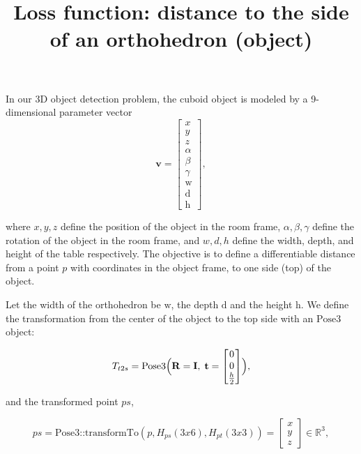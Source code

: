 \documentclass[11pt]{article}
\begin{document}
\title{Loss function: distance to the side of an orthohedron (object)}
\maketitle

    In our 3D object detection problem, the cuboid object is modeled by a 9-dimensional parameter vector
    \begin{equation}
        \mathbf{v} = \begin{bmatrix} x \\ y \\ z \\ \alpha \\ \beta \\ \gamma \\ \text{w} \\ \text{d} \\ \text{h} \end{bmatrix},\label{eq:equation_1}
    \end{equation}

    where $x,y,z$ define the position of the object in the room frame, $\alpha,\beta,\gamma$ define the rotation of the object in the room frame, and $w,d,h$ define the width, depth, and height of the table respectively.
    The objective is to define a differentiable distance from a point $p$ with coordinates in the object frame, to one side (top) of the object.

    Let the width of the orthohedron be \(\text{w}\), the depth \(\text{d}\) and the height \(\text{h}\).
    We define the transformation from the center of the object to the top side with an \(\text{Pose3}\) object:

    \begin{equation}
        T_{t2s} = \text{Pose3}\Bigl(\mathbf{R}=\mathbf{I},\; \mathbf{t} = \begin{bmatrix} 0 \\  0 \\ \frac{h}{2} \end{bmatrix}\Bigr),
    \end{equation}

    and the transformed point $ps$,

    \begin{equation}
        ps = \text{Pose3::transformTo}(p,H_{ps}(3x6), H_{pt}(3x3)) = \begin{bmatrix} x \\ y \\ z \end{bmatrix} \in \mathbb{R}^3,
    \end{equation}
\end{document}
